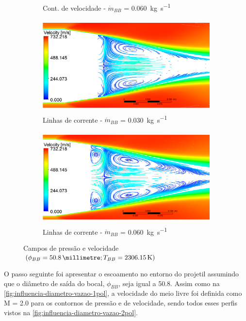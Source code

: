 \begin{figure}[!htpb]
\begin{subfigure}[b]{0.47\textwidth}
        \caption{Cont. de velocidade - \(\Dot{m}_{BB}\) = \qty{0,060}{\kilogram\per\second}}
        \label{fig:contorno-velocidade-bb-2pol-vazao0060}
    \end{subfigure}
    \hfill
    \begin{subfigure}[b]{0.47\textwidth} %
        \centering
        \includegraphics[height=5cm,width=\textwidth]{corrente-velocidade-2306K-vazao-0030-2pol.png}
        \caption{Linhas de corrente - \(\Dot{m}_{BB}\) = \qty{0,030}{\kilogram\per\second}}
        \label{fig:corrente-velocidade-bb-2pol-vazao0030}
    \end{subfigure}
    \hfill
    \begin{subfigure}[b]{0.47\textwidth} %
        \centering
        \includegraphics[height=5cm,width=\textwidth]{corrente-velocidade-2306K-vazao-0060-2pol.png}
        \caption{Linhas de corrente - \(\Dot{m}_{BB}\) = \qty{0,060}{\kilogram\per\second}}
        \label{fig:corrente-velocidade-bb-2pol-vazao0060}
    \end{subfigure}
    \caption{Campos de pressão e velocidade \(\left(\phi_{BB} = \qty{50,8}{\millimetre}; T_{BB} = \qty{2306,15}{\kelvin}\right)\)}
	\label{fig:influencia-diametro-vazao-2pol}
\end{figure}

O passo seguinte foi apresentar o escoamento no entorno do projetil assumindo que o diâmetro de saída do bocal, \(\phi_{BB}\), seja igual a \qty{50,8}{\millimetre}. Assim como na \autoref{fig:influencia-diametro-vazao-1pol}, a velocidade do meio livre foi definida como M = \num{2,0} para os contornos de pressão e de velocidade, sendo todos esses perfis vistos na \autoref{fig:influencia-diametro-vazao-2pol}.

